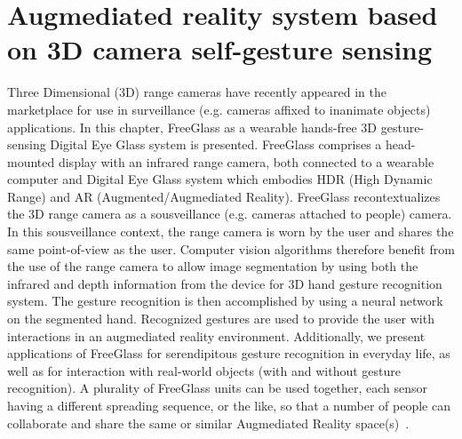 \chapter{Augmediated reality system based on 3D camera self-gesture sensing}
\label{ar3dgesture}

Three Dimensional (3D) range cameras have recently appeared in the marketplace for use in surveillance
(e.g. cameras affixed to inanimate objects) applications. In this chapter, FreeGlass as a wearable hands-free 3D gesture-sensing Digital Eye Glass system is presented. FreeGlass comprises a head-mounted display with an infrared range camera, both connected to a wearable computer and Digital Eye Glass system which embodies HDR (High Dynamic Range) and AR (Augmented/Augmediated Reality). FreeGlass recontextualizes the 3D range camera as a sousveillance (e.g. cameras attached to people) camera. In this sousveillance context, the range camera is worn by the user and shares the same point-of-view as the user. Computer vision algorithms therefore benefit from the use of the range camera to allow image segmentation by using both the infrared and depth information from the device for 3D hand gesture recognition system. The gesture recognition is then accomplished by using a neural network on the segmented hand. Recognized gestures are used to provide the user with interactions in an augmediated reality environment. Additionally, we present applications of FreeGlass for serendipitous gesture recognition in everyday life, as well as for interaction with real-world objects (with and without gesture recognition). A plurality of FreeGlass units can be used together, each sensor having a different spreading sequence, or the like, so that a number of people can collaborate and share the same or similar Augmediated Reality space(s)~\cite{billinghurst2002collaborative,billinghurst2000mixing}.

